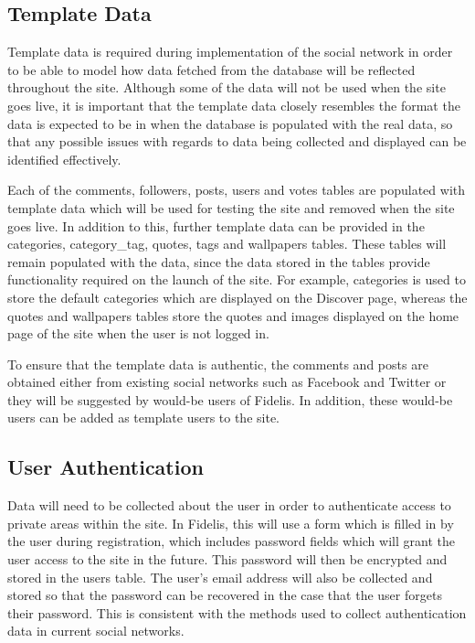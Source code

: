 \subsection{Template Data}
Template data is required during implementation of the social network in order to be able to model how data fetched from the database will be reflected throughout the site. Although some of the data will not be used when the site goes live, it is important that the template data closely resembles the format the data is expected to be in when the database is populated with the real data, so that any possible issues with regards to data being collected and displayed can be identified effectively.

Each of the comments, followers, posts, users and votes tables are populated with template data which will be used for testing the site and removed when the site goes live. In addition to this, further template data can be provided in the categories, category\_tag, quotes, tags and wallpapers tables. These tables will remain populated with the data, since the data stored in the tables provide functionality required on the launch of the site. For example, categories is used to store the default categories which are displayed on the Discover page, whereas the quotes and wallpapers tables store the quotes and images displayed on the home page of the site when the user is not logged in.

To ensure that the template data is authentic, the comments and posts are obtained either from existing social networks such as Facebook and Twitter or they will be suggested by would-be users of Fidelis. In addition, these would-be users can be added as template users to the site.

\subsection{User Authentication}
Data will need to be collected about the user in order to authenticate access to private areas within the site. In Fidelis, this will use a form which is filled in by the user during registration, which includes password fields which will grant the user access to the site in the future. This password will then be encrypted and stored in the users table. The user's email address will also be collected and stored so that the password can be recovered in the case that the user forgets their password. This is consistent with the methods used to collect authentication data in current social networks.